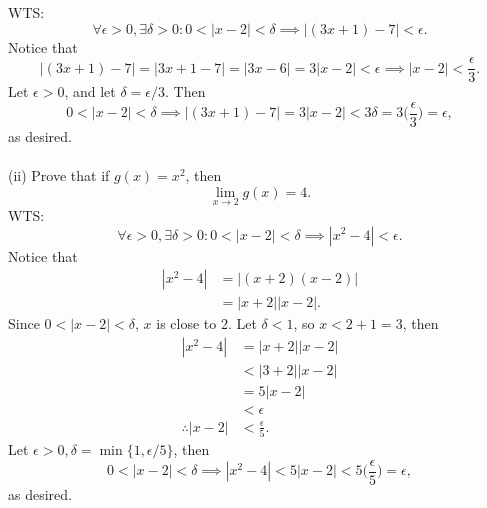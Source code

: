 \documentclass{article}
\begin{document}
            WTS:
            \begin{equation*}
                \forall \epsilon > 0, \exists \delta > 0: 0<|x-2|<\delta \implies |(3x+1)-7|<\epsilon.
            \end{equation*}
            Notice that
            \begin{equation*}
                |(3x+1)-7| = |3x+1-7| = |3x-6| = 3|x-2| < \epsilon \implies |x-2| < \frac{\epsilon}{3}.
            \end{equation*}
            Let $\epsilon>0$, and let $\delta = \epsilon/3$. Then \begin{equation*}
                0 < |x-2| < \delta \implies |(3x+1)-7| = 3|x-2| < 3 \delta = 3\bigg(\frac{\epsilon}{3}\bigg) = \epsilon,
            \end{equation*}
            as desired.
            \\ \\
            (ii) Prove that if $g(x)=x^2$, then
            \begin{equation*}
                \lim_{x \to 2} g(x) = 4.
            \end{equation*}
            WTS:
            \begin{equation*}
                \forall \epsilon > 0, \exists \delta > 0: 0<|x-2|<\delta \implies |x^2-4|<\epsilon.
            \end{equation*}
            Notice that
            \begin{align*}
                |x^2 - 4| & = |(x+2)(x-2)| \\
                & = |x+2| |x-2|.
            \end{align*}
            Since $0<|x-2|<\delta$, $x$ is close to 2. Let $\delta < 1$, so $x<2+1=3$, then
            \begin{align*}
                |x^2-4| & = |x+2| |x-2| \\
                & < |3+2| |x-2| \\
                & = 5|x-2| \\
                & < \epsilon \\ 
                \therefore |x-2| & < \frac{\epsilon}{5}.
            \end{align*}
            Let $\epsilon>0, \delta=\min\{1,\epsilon/5\}$, then
            \begin{equation*}
                0<|x-2|<\delta \implies |x^2-4| < 5|x-2| < 5\bigg(\frac{\epsilon}{5}\bigg) = \epsilon,
            \end{equation*}
            as desired.
            
\end{document}
